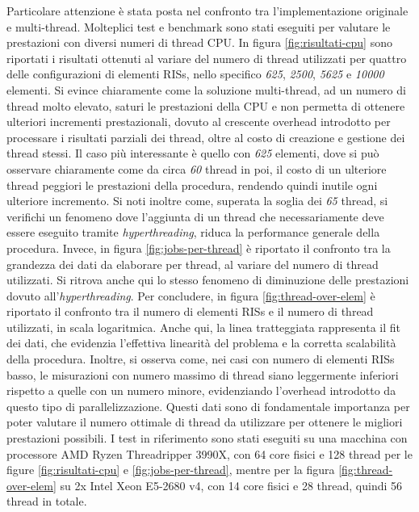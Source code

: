 Particolare attenzione è stata posta nel confronto tra l'implementazione
originale e multi-thread. Molteplici test e benchmark sono stati eseguiti per valutare
le prestazioni con diversi numeri di thread CPU. In figura
\ref{fig:risultati-cpu} sono riportati i risultati ottenuti al variare del
numero di thread utilizzati per quattro delle configurazioni di elementi RISs, nello
specifico \textit{625}, \textit{2500}, \textit{5625} e \textit{10000} elementi.
Si evince chiaramente come la soluzione multi-thread, ad un numero di thread molto
elevato, saturi le prestazioni della CPU e non permetta di ottenere ulteriori
incrementi prestazionali, dovuto al crescente overhead introdotto per processare
i risultati parziali dei thread, oltre al costo di creazione e gestione dei
thread stessi. Il caso più interessante è quello con \textit{625} elementi, dove
si può osservare chiaramente come da circa \textit{60} thread in poi, il costo di
un ulteriore thread peggiori le prestazioni della procedura, rendendo quindi
inutile ogni ulteriore incremento. Si noti inoltre come, superata la soglia dei
\textit{65} thread, si verifichi un fenomeno dove l'aggiunta di un thread che
necessariamente deve essere eseguito tramite \textit{hyperthreading}, riduca la
performance generale della procedura. Invece, in figura
\ref{fig:jobs-per-thread} è riportato il confronto tra la grandezza dei dati da
elaborare per thread, al variare del numero di thread utilizzati. Si ritrova
anche qui lo stesso fenomeno di diminuzione delle prestazioni dovuto all'\textit{hyperthreading}.
Per concludere, in figura \ref{fig:thread-over-elem} è riportato il confronto tra
il numero di elementi RISs e il numero di thread utilizzati, in scala
logaritmica. Anche qui, la linea tratteggiata rappresenta il fit dei dati, che evidenzia
l'effettiva linearità del problema e la corretta scalabilità della procedura.
Inoltre, si osserva come, nei casi con numero di elementi RISs basso, le
misurazioni con numero massimo di thread siano leggermente inferiori rispetto a
quelle con un numero minore, evidenziando l'overhead introdotto da questo tipo di
parallelizzazione. Questi dati sono di fondamentale importanza per poter
valutare il numero ottimale di thread da utilizzare per ottenere le migliori
prestazioni possibili. I test in riferimento sono stati eseguiti su una macchina
con processore AMD Ryzen Threadripper 3990X, con 64 core fisici e 128 thread per
le figure \ref{fig:risultati-cpu} e \ref{fig:jobs-per-thread}, mentre per la figura
\ref{fig:thread-over-elem} su 2x Intel Xeon E5-2680 v4, con 14 core fisici e 28
thread, quindi 56 thread in totale.

